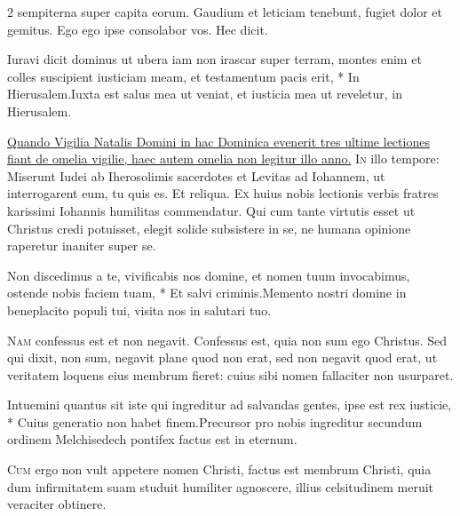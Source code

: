 \begin{multicols*}{2}
sempiterna super capita eorum. Gaudium et leticiam tenebunt, fugiet dolor et gemitus. Ego ego ipse consolabor vos. Hec dicit.
\begin{responsory-doxology}
{Iuravi dicit dominus ut ubera iam non irascar super terram, montes enim et colles suscipient iusticiam meam, et testamentum pacis erit, * In Hierusalem.}{Iuxta est salus mea ut veniat, et iusticia mea ut reveletur, in Hierusalem.}
\end{responsory-doxology}%
\newline \ul{Quando Vigilia Natalis Domini in hac Dominica evenerit tres ultime lectiones fiant de omelia vigilie, haec autem omelia non legitur illo anno.}
\lettrine[lines=2]{\zallmancaps \color{Red} I}{n} illo tempore: Miserunt Iudei ab Iherosolimis sacerdotes et Levitas ad Iohannem, ut interrogarent eum, tu quis es. Et reliqua.
\lettrine[lines=2]{\zallmancaps \color{Blue} E}{x} huius nobis lectionis verbis fratres karissimi Iohannis humilitas commendatur. Qui cum tante virtutis esset ut Christus credi potuisset, elegit solide subsistere in se, ne humana opinione raperetur inaniter super se.
\begin{responsory}
{Non discedimus a te, vivificabis nos domine, et nomen tuum invocabimus, ostende nobis faciem tuam, * Et salvi criminis.}{Memento nostri domine in beneplacito populi tui, visita nos in salutari tuo.}
\end{responsory}%
\lettrine[lines=2]{\zallmancaps \color{Red} N}{am} confessus est et non negavit. Confessus est, quia non sum ego Christus. Sed qui dixit, non sum, negavit plane quod non erat, sed non negavit quod erat, ut veritatem loquens eius membrum fieret: cuius sibi nomen fallaciter non usurparet.
\begin{responsory}
{Intuemini quantus sit iste qui ingreditur ad salvandas gentes, ipse est rex iusticie, * Cuius generatio non habet finem.}{Precursor pro nobis ingreditur secundum ordinem Melchisedech pontifex factus est in eternum.}
\end{responsory}%
\lettrine[lines=2]{\zallmancaps \color{Blue} C}{um} ergo non vult appetere nomen Christi, factus est membrum Christi, quia dum infirmitatem suam studuit humiliter agnoscere, illius celsitudinem meruit veraciter obtinere.

\end{multicols*}
